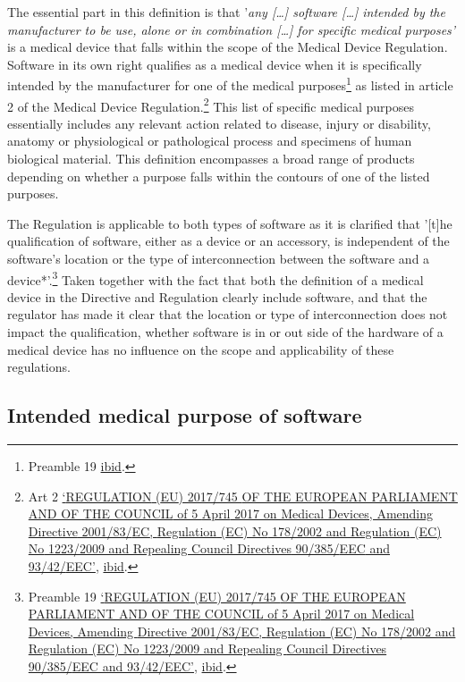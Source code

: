 \documentclass[
]{scrartcl}
\begin{document}
The essential part in this definition is that '\emph{any {[}\ldots{]} software {[}\ldots{]} intended by the manufacturer to be use, alone or in combination {[}\ldots{]} for specific medical purposes'} is a medical device that falls within the scope of the Medical Device Regulation. Software in its own right qualifies as a medical device when it is specifically intended by the manufacturer for one of the medical purposes\footnote{Preamble 19 \protect\hyperlink{ref-REGULATIONEU2017a}{ibid}.} as listed in article 2 of the Medical Device Regulation.\footnote{Art 2 \protect\hyperlink{ref-REGULATIONEU2017a}{{`{REGULATION} ({EU}) 2017/745 {OF THE EUROPEAN PARLIAMENT AND OF THE COUNCIL} of 5 {April} 2017 on Medical Devices, Amending {Directive} 2001/83/{EC}, {Regulation} ({EC}) {No} 178/2002 and {Regulation} ({EC}) {No} 1223/2009 and Repealing {Council Directives} 90/385/{EEC} and 93/42/{EEC}'}}, \protect\hyperlink{ref-REGULATIONEU2017a}{ibid}.} This list of specific medical purposes essentially includes any relevant action related to disease, injury or disability, anatomy or physiological or pathological process and specimens of human biological material. This definition encompasses a broad range of products depending on whether a purpose falls within the contours of one of the listed purposes.

The Regulation is applicable to both types of software as it is clarified that '{[}t{]}he qualification of software, either as a device or an accessory, is independent of the software's location or the type of interconnection between the software and a device*'.\footnote{Preamble 19 \protect\hyperlink{ref-REGULATIONEU2017a}{{`{REGULATION} ({EU}) 2017/745 {OF THE EUROPEAN PARLIAMENT AND OF THE COUNCIL} of 5 {April} 2017 on Medical Devices, Amending {Directive} 2001/83/{EC}, {Regulation} ({EC}) {No} 178/2002 and {Regulation} ({EC}) {No} 1223/2009 and Repealing {Council Directives} 90/385/{EEC} and 93/42/{EEC}'}}, \protect\hyperlink{ref-REGULATIONEU2017a}{ibid}.} Taken together with the fact that both the definition of a medical device in the Directive and Regulation clearly include software, and that the regulator has made it clear that the location or type of interconnection does not impact the qualification, whether software is in or out side of the hardware of a medical device has no influence on the scope and applicability of these regulations.

\hypertarget{intended-medical-purpose-of-software}{%
\subsection{Intended medical purpose of software}\label{intended-medical-purpose-of-software}}
\end{document}
